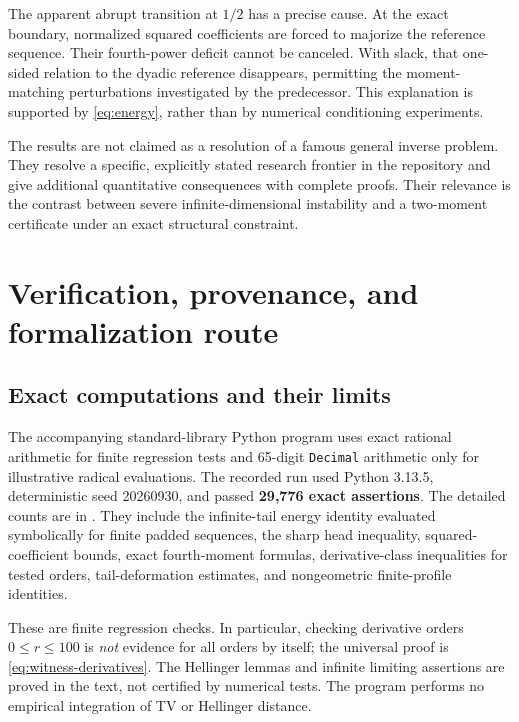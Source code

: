 \documentclass[11pt,a4paper]{article}
\numberwithin{equation}{section}
\theoremstyle{definition}
\theoremstyle{remark}
\begin{document}
The apparent abrupt transition at $1/2$ has a precise cause. At the exact
boundary, normalized squared coefficients are forced to majorize the
reference sequence. Their fourth-power deficit cannot be canceled. With
slack, that one-sided relation to the dyadic reference disappears, permitting
the moment-matching perturbations investigated by the predecessor. This
explanation is supported by \eqref{eq:energy}, rather than by numerical
conditioning experiments.

The results are not claimed as a resolution of a famous general inverse
problem. They resolve a specific, explicitly stated research frontier in the
repository and give additional quantitative consequences with complete proofs.
Their relevance is the contrast between severe infinite-dimensional
instability and a two-moment certificate under an exact structural constraint.

\section{Verification, provenance, and formalization route}
\label{sec:audit}

\subsection{Exact computations and their limits}

The accompanying standard-library Python program 
uses exact rational arithmetic for finite regression tests and 65-digit
\texttt{Decimal} arithmetic only for illustrative radical evaluations.
The recorded run used Python 3.13.5, deterministic seed 20260930, and passed
\textbf{29,776 exact assertions}. The detailed counts are in
. They include the infinite-tail energy
identity evaluated symbolically for finite padded sequences, the sharp head
inequality, squared-coefficient bounds, exact fourth-moment formulas,
derivative-class inequalities for tested orders, tail-deformation estimates,
and nongeometric finite-profile identities.

These are finite regression checks. In particular, checking derivative orders
$0\le r\le100$ is \emph{not} evidence for all orders by itself; the universal
proof is \eqref{eq:witness-derivatives}. The Hellinger lemmas and infinite
limiting assertions are proved in the text, not certified by numerical tests.
The program performs no empirical integration of TV or Hellinger distance.
\end{document}
